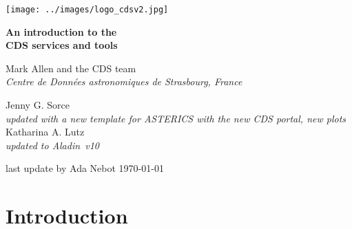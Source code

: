 \documentclass [a4paper, 12pt]{article}
\newcommand{\aladin}{{\textsc{A}{ladin}}}
\begin{document}
\begin{center}\texttt{[image: ../images/logo\_cdsv2.jpg]} 
\end{center}


\vspace{1cm}
\Huge
\begin{center}
\bf An introduction to the \\ CDS services and tools\\
\end{center}


\vspace{1cm}
\large
\begin{center}
Mark Allen and the CDS team\\
\textit{Centre de Donn\'ees astronomiques de Strasbourg, France}
\end{center}
\vspace{0.5cm}
\begin{center}
Jenny G. Sorce\\
\textit{updated with a new template for ASTERICS with the new CDS 
portal, new plots}\\
\vspace{0.5cm}
Katharina A. Lutz\\
\textit{updated to \aladin\ v10}
\end{center}
\vspace{0.5cm}
\begin{center}
last update by Ada Nebot \today
\end{center}




\newpage
\normalsize
\vfill
\tableofcontents
\vfill

\newpage

\justify
\section{Introduction}
\end{document}
